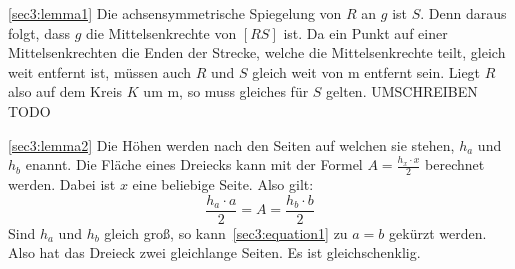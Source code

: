 \documentclass[10pt, a4paper]{amsart}
\makeatletter
\renewenvironment{proof}[1][\proofname]{\par
\pushQED{\qed}%
\normalfont \topsep6\p@\@plus6\p@\relax
\trivlist
\item\relax
{\bfseries#1}\hspace\labelsep\ignorespaces
}{%
\popQED\endtrivlist\@endpefalse
}
\newenvironment{proof_thm}[1]{
\begin{proof}[\proofname~(#1)]}{\end{proof}}
\makeatother
\begin{document}
\begin{proof_thm}{\autoref{sec3:lemma1}}
  Die achsensymmetrische Spiegelung von $R$ an $g$ ist $S$. Denn daraus folgt,
  dass $g$ die Mittelsenkrechte von $[RS]$ ist. Da ein Punkt auf einer
  Mittelsenkrechten die Enden der Strecke, welche die Mittelsenkrechte teilt,
  gleich weit entfernt ist, müssen auch $R$ und $S$ gleich weit von m entfernt
  sein. Liegt $R$ also auf dem Kreis $K$ um m, so muss gleiches für $S$ gelten.
  UMSCHREIBEN
  TODO
\end{proof_thm}
\begin{proof_thm}{\autoref{sec3:lemma2}}
  Die Höhen werden nach den Seiten auf welchen sie stehen, $h_a$ und $h_b$
  enannt. Die Fläche eines Dreiecks kann mit der Formel $A=\frac{h_x\cdot
    x}{2}$ berechnet werden. Dabei ist $x$ eine beliebige Seite. Also gilt:
  \begin{equation}\label{sec3:equation1}
    \dfrac{h_a\cdot a}{2}=A=\dfrac{h_b\cdot b}{2}
  \end{equation}
  Sind $h_a$ und $h_b$ gleich groß, so kann~\eqref{sec3:equation1} zu $a=b$
  gekürzt werden. Also hat das Dreieck zwei gleichlange Seiten. Es ist
  gleichschenklig.
\end{proof_thm}
\end{document}
